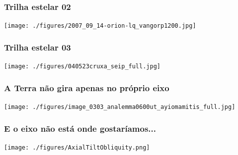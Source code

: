 \begin{frame}
  \frametitle{Trilha estelar 02}
  \begin{center}
    \texttt{[image: ./figures/2007\_09\_14-orion-lq\_vangorp1200.jpg]}
  \end{center}
\end{frame}


\begin{frame}
  \frametitle{Trilha estelar 03}
  \begin{center}
    \texttt{[image: ./figures/040523cruxa\_seip\_full.jpg]}
  \end{center}
\end{frame}


\begin{frame}
  \frametitle{A Terra não gira apenas no próprio eixo}
  \begin{center}
    \texttt{[image: ./figures/image\_0303\_analemma0600ut\_ayiomamitis\_full.jpg]}
  \end{center}
\end{frame}


\begin{frame}
  \frametitle{E o eixo não está onde gostaríamos...}
  \begin{center}
    \texttt{[image: ./figures/AxialTiltObliquity.png]}
  \end{center}
\end{frame}


